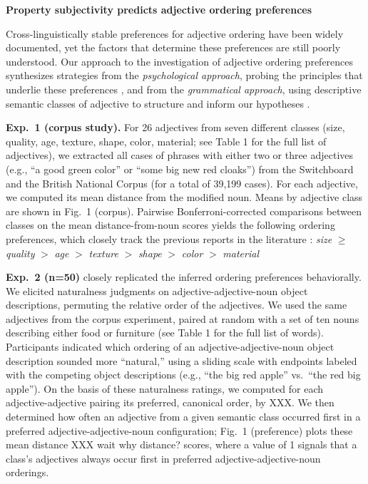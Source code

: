 \documentclass[12pt]{article}
\begin{document}
\begin{center}\textbf{Property subjectivity predicts adjective ordering preferences}
\end{center}
	
	\vspace{-15pt}
	
Cross-linguistically stable preferences for adjective ordering have been widely documented, yet the factors that determine these preferences are still poorly understood. Our approach to the investigation of adjective ordering preferences synthesizes strategies from the \emph{psychological approach}, probing the principles that underlie these preferences \cite{sweet1898,ziff1960,martin1969determinants,martin1969competence,martin1970,kemmereretal2009}, and from the \emph{grammatical approach}, using descriptive semantic classes of adjective to structure and inform our hypotheses \cite{dixon1982,sproatshih1991,cinque1994,scott2002}. 

\textbf{Exp.~1 (corpus study).} For 26 adjectives from seven different classes (size, quality, age, texture, shape, color, material; see Table 1 for the full list of adjectives), we extracted all cases of phrases with either two or three adjectives (e.g., ``a good green color'' or ``some big new red cloaks'') from the Switchboard and the British National Corpus (for a total of 39,199 cases). For each adjective, we  computed its mean distance from the modified noun. Means by adjective class are shown in Fig.~1 (corpus). Pairwise Bonferroni-corrected comparisons between classes on the mean distance-from-noun scores yields the following ordering preferences, which closely track the previous reports in the literature \cite{sproatshih1991,dixon1982}:
\emph{size} $\geq$ \emph{quality} $>$  \emph{age} $>$  \emph{texture} $>$  \emph{shape} $>$  \emph{color} $>$  \emph{material} %


\textbf{Exp.~2 (n=50)} closely replicated the inferred ordering preferences behaviorally. We elicited naturalness judgments on adjective-adjective-noun object descriptions, permuting the relative order of the adjectives. We used the same adjectives from the corpus experiment, paired at random with a set of ten nouns describing either food or furniture (see Table 1 for the full list of words).
Participants indicated which ordering of an adjective-adjective-noun object description sounded more ``natural,'' using a sliding scale with endpoints labeled with the competing object descriptions (e.g., ``the big red apple'' vs.\ ``the red big apple''). On the basis of these naturalness ratings, we computed for each adjective-adjective pairing its preferred, canonical order, by XXX. We then determined how often an adjective from a given semantic class occurred first in a preferred adjective-adjective-noun configuration; Fig.~1 (preference) plots these mean distance XXX wait why distance? scores, where a value of 1 signals that a class's adjectives always occur first in preferred adjective-adjective-noun orderings. 
\end{document}
